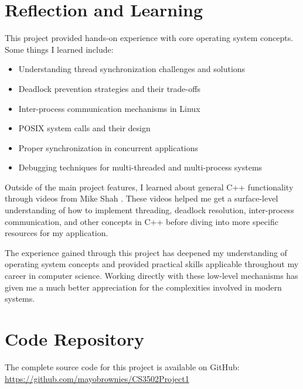 \documentclass[12pt]{article}
\begin{document}
\section{Reflection and Learning}
This project provided hands-on experience with core operating system concepts. Some things I learned include:
\begin{itemize}
    \item Understanding thread synchronization challenges and solutions
    \item Deadlock prevention strategies and their trade-offs
    \item Inter-process communication mechanisms in Linux
    \item POSIX system calls and their design
    \item Proper synchronization in concurrent applications
    \item Debugging techniques for multi-threaded and multi-process systems
\end{itemize}

Outside of the main project features, I learned about general C++ functionality through videos from Mike Shah \cite{mike_shah}. These videos helped me get a surface-level understanding of how to implement threading, deadlock resolution, inter-process communication, and other concepts in C++ before diving into more specific resources for my application.

The experience gained through this project has deepened my understanding of operating system concepts and provided practical skills applicable throughout my career in computer science. Working directly with these low-level mechanisms has given me a much better appreciation for the complexities involved in modern systems.

\section{Code Repository}
The complete source code for this project is available on GitHub:
\url{https://github.com/mayobrownies/CS3502Project1}




\end{document}
